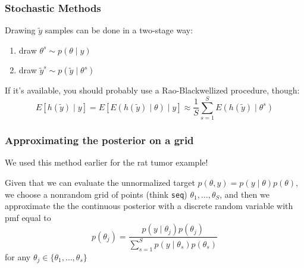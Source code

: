 \documentclass{beamer}
\begin{document}
\begin{frame}
\frametitle{Stochastic Methods}

Drawing $\tilde{y}$ samples can be done in a two-stage way:
\begin{enumerate}
\item draw $\theta^s \sim p(\theta \mid y)$
\item draw $\tilde{y}^s \sim p(\tilde{y} \mid \theta^s)$
\end{enumerate}
\pause

If it's available, you should probably use a Rao-Blackwellized procedure, though:
\[
E[h(\tilde{y}) \mid y] = E[E\left( h(\tilde{y}) \mid \theta \right) \mid y] \approx \frac{1}{S} \sum_{s=1}^S E\left( h(\tilde{y}) \mid \theta^s \right)
\]


\end{frame}
\begin{frame}[fragile]
\frametitle{Approximating the posterior on a grid}

We used this method earlier for the rat tumor example!
\newline

Given that we can evaluate the unnormalized target $p(\theta, y) = p(y \mid \theta)p(\theta)$, we choose a nonrandom grid of points (think \verb|seq|) $\theta_1, \ldots, \theta_S$, and then we approximate the the continuous posterior with a discrete random variable with pmf equal to
\[
p(\theta_j) = \frac{p(y \mid \theta_j)p(\theta_j)}{\sum_{s=1}^S p(y \mid \theta_s)p(\theta_s) }
\]
for any $\theta_j \in \{\theta_1, \ldots, \theta_s\}$

\end{frame}
\end{document}
